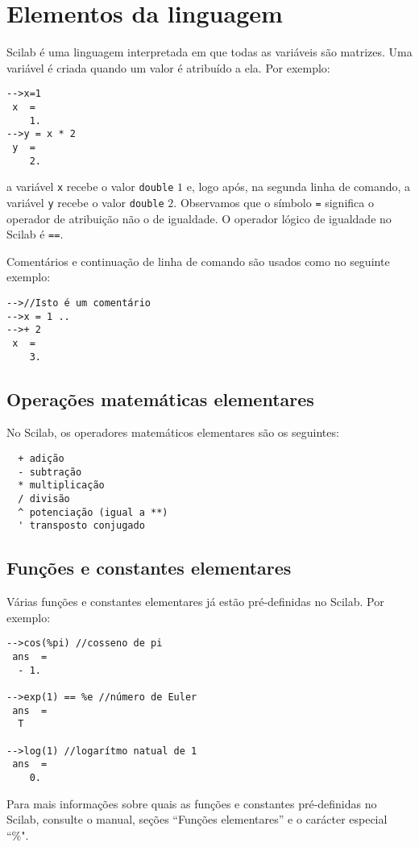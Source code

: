 \documentclass[main.tex]{subfiles}
\begin{document}
\section{Elementos da linguagem}

Scilab é uma linguagem interpretada em que todas as variáveis são matrizes. Uma variável é criada quando um valor é atribuído a ela. Por exemplo:
\begin{verbatim}
-->x=1
 x  =
    1.  
-->y = x * 2
 y  =
    2.  
\end{verbatim}
a variável \verb+x+ recebe o valor \verb+double+ $1$ e, logo após, na segunda linha de comando, a variável \verb+y+ recebe o valor \verb+double+ $2$. Observamos que o símbolo \verb+=+ significa o operador de atribuição não o de igualdade. O operador lógico de igualdade no Scilab é \verb+==+.

Comentários e continuação de linha de comando são usados como no seguinte exemplo:
\begin{verbatim}
-->//Isto é um comentário
-->x = 1 ..
-->+ 2
 x  =
    3.  
\end{verbatim}

\subsection{Operações matemáticas elementares}

No Scilab, os operadores matemáticos elementares são os seguintes:
\begin{verbatim}
  + adição
  - subtração
  * multiplicação
  / divisão
  ^ potenciação (igual a **)
  ' transposto conjugado
\end{verbatim}

\subsection{Funções e constantes elementares}

Várias funções e constantes elementares já estão pré-definidas no Scilab. Por exemplo:
\begin{verbatim}
-->cos(%pi) //cosseno de pi
 ans  =
  - 1.  
 
-->exp(1) == %e //número de Euler
 ans  =
  T  
 
-->log(1) //logarítmo natual de 1
 ans  =
    0.  
\end{verbatim}
Para mais informações sobre quais as funções e constantes pré-definidas no Scilab, consulte o manual, seções ``Funções elementares'' e o carácter especial ``\%".
\end{document}
